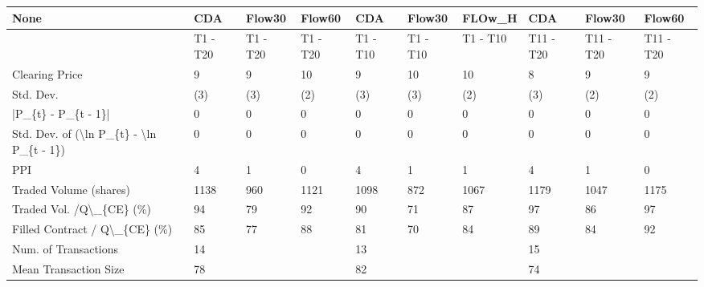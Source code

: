 \begin{tabular}{llllllllll}
\hline
 None                                                      & CDA      & Flow30    & Flow60    & CDA      & Flow30    & FLOw\_H   & CDA       & Flow30     & Flow60     \\
\hline
                                                           & T1 - T20 & T1 - T20 & T1 - T20 & T1 - T10 & T1 - T10 & T1 - T10 & T11 - T20 & T11 - T20 & T11 - T20 \\
 Clearing Price                                            & 9        & 9        & 10       & 9        & 10       & 10       & 8         & 9         & 9         \\
 Std. Dev.                                                 & (3)      & (3)      & (2)      & (3)      & (3)      & (2)      & (3)       & (2)       & (2)       \\
 |P\_\{t\} - P\_\{t - 1\}|                                       & 0        & 0        & 0        & 0        & 0        & 0        & 0         & 0         & 0         \\
 Std. Dev. of (\textbackslash{}ln P\_\{t\} - \textbackslash{}ln P\_\{t - 1\})                  & 0        & 0        & 0        & 0        & 0        & 0        & 0         & 0         & 0         \\
 PPI                                                       & 4        & 1        & 0        & 4        & 1        & 1        & 4         & 1         & 0         \\
 Traded Volume (shares)                                    & 1138     & 960      & 1121     & 1098     & 872      & 1067     & 1179      & 1047      & 1175      \\
 Traded Vol. /Q\textbackslash{}\_\{CE\} (\%)                                  & 94       & 79       & 92       & 90       & 71       & 87       & 97        & 86        & 97        \\
 Filled Contract / Q\textbackslash{}\_\{CE\} (\%)                             & 85       & 77       & 88       & 81       & 70       & 84       & 89        & 84        & 92        \\
 Num. of Transactions                                      & 14       &          &          & 13       &          &          & 15        &           &           \\
 Mean Transaction Size                                     & 78       &          &          & 82       &          &          & 74        &           &           \\

\end{tabular}
